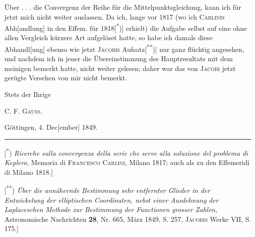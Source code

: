  Über {\ensuremath{{.}\;{.}\;{.}}} die Convergenz der Reihe für die Mittelpunktsgleichung, kann ich für jetzt mich nicht weiter auslassen. Da ich, lange vor 1817 (wo ich \textsc{Carlinis} Abh[andlung] in den Effem. für 1818[\textsuperscript{*})] erhielt) die Aufgabe selbst auf eine ohne allen Vergleich kürzere Art aufgelöset hatte, so habe ich damals diese Abhandl[ung] ebenso wie jetzt \textsc{Jacobis} Aufsatz[\textsuperscript{**})] nur ganz flüchtig angesehen, und nachdem ich in jener die Übereinstimmung des Hauptresultats mit dem meinigen bemerkt hatte, nicht weiter gelesen; daher war das von \textsc{Jacobi} jetzt gerügte Versehen von mir nicht bemerkt.
\begin{flushright}Stets der Ihrige\hspace*{.18\linewidth}\par C. F. \textsc{Gauss}.\end{flushright}
\indent Göttingen, 4. Dec[ember] 1849.
\par\medskip\noindent\rule{.24\linewidth}{.4pt}\par\smallskip
{\small
\noindent\hspace*{\parindent}[\textsuperscript{*}) \textit{Ricerche sulla convergenza della serie che serve alla soluzione del problema di Keplero}, Memoria di \textsc{Francesco Carlini}, Milano 1817; auch als  zu den Effemeridi di Milano 1818.]
\par\noindent\hspace*{\parindent}[\textsuperscript{**}) \textit{Über die annähernde Bestimmung sehr entfernter Glieder in der Entwickelung der elliptischen Coordinaten, nebst einer Ausdehnung der Laplaceschen Methode zur Bestimmung der Functionen grosser Zahlen}, Astronomische Nachrichten \textbf{28}, Nr. 665, März 1849, S. 257, \textsc{Jacobis} Werke VII, S. 175.]
\par}
